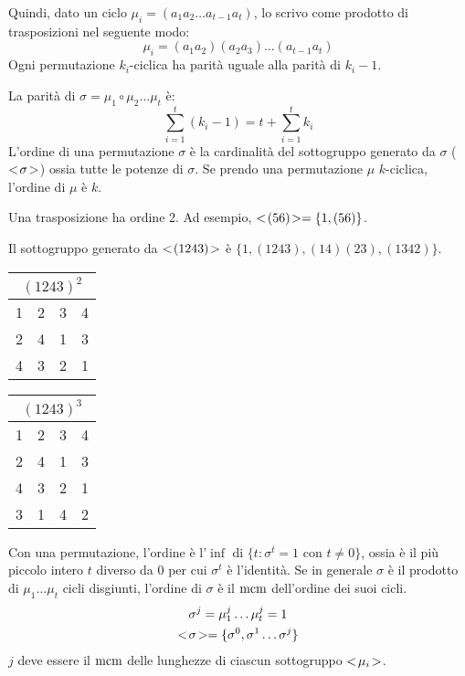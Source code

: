 Quindi, dato un ciclo $\mu_i = (a_1 a_2 \dots a_{t-1} a_t)$, lo scrivo come prodotto di trasposizioni nel seguente modo:
\[
\mu_i = (a_1 a_2) (a_2 a_3) \dots (a_{t-1} a_t)
\]
Ogni permutazione $k_i$-ciclica ha parit\`a uguale alla parit\`a di $k_i - 1$.

La parit\`a di $\sigma = \mu_1 \circ \mu_2 \ldots \mu_t$ \`e:
\[
\sum_{i = 1}^{t} (k_i - 1) = t + \sum_{i = 1}^{t} k_i
\]
L'ordine di una permutazione $\sigma$ \`e la cardinalit\`a del sottogruppo generato da $\sigma$ ($<\!{\sigma}\!>$) ossia tutte le potenze di $\sigma$. Se prendo una permutazione $\mu$ $k$-ciclica, l'ordine di $\mu$ \`e $k$.

Una trasposizione ha ordine 2. Ad esempio, $<\!{(5 6)}\!> = \{ 1, (5 6) \}$.

Il sottogruppo generato da $<\!{(1 2 4 3)}\!>$ \`e $ \{ 1, (1 2 4 3), (1 4) (2 3), (1 3 4 2) \}$.

\begin{table}[ht]
\centering
\begin{tabular}{*{4}{c}}
\multicolumn{4}{c}{$(1 2 4 3)^2$} \\
\hline
1 & 2 & 3 & 4 \\
2 & 4 & 1 & 3 \\
4 & 3 & 2 & 1
\end{tabular}
\qquad
\begin{tabular}{*{4}{c}}
\multicolumn{4}{c}{$(1 2 4 3)^3$} \\
\hline
1 & 2 & 3 & 4 \\
2 & 4 & 1 & 3 \\
4 & 3 & 2 & 1 \\
3 & 1 & 4 & 2
\end{tabular}
\end{table}

Con una permutazione, l'ordine \`e l'$\inf$ di $ \{ t : \sigma^t = 1 \text{ con } t \neq 0 \}$, ossia \`e il pi\`u piccolo intero $t$ diverso da 0 per cui $\sigma^t$ \`e l'identit\`a. Se in generale $\sigma$ \`e il prodotto di $\mu_1 \dots \mu_t$ cicli disgiunti, l'ordine di $\sigma$ \`e il $\operatorname{mcm}$ dell'ordine dei suoi cicli.
\begin{gather*}
\sigma^j = \mu_1^j \dots \mu_t^j = 1 \\
<\!{\sigma}\!> = \{ \sigma^0, \sigma^1 \dots \sigma^j \}
\end{gather*}
$j$ deve essere il $\operatorname{mcm}$ delle lunghezze di ciascun sottogruppo $<\!{\mu_i}\!>$.

